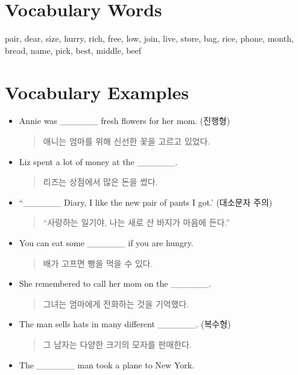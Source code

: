 \documentclass{article}
\begin{document}
\renewcommand{\familydefault}{\sfdefault}
\onehalfspacing
\fontsize{12pt}{14pt}\selectfont

\section*{Vocabulary Words}
\begin{addmargin}[1em]{1em}
pair, dear, size, hurry, rich, free, low, join, live, store, bag, rice, phone, month, bread, name, pick, best, middle, beef
\end{addmargin}

\section*{Vocabulary Examples}
\begin{addmargin}[1em]{1em}
\begin{itemize}
    \item Annie was \_\_\_\_\_\_ fresh flowers for her mom. (진행형)
    \begin{quote}
    애니는 엄마를 위해 신선한 꽃을 고르고 있었다.
    \end{quote}
    \item Liz spent a lot of money at the \_\_\_\_\_\_.
    \begin{quote}
    리즈는 상점에서 많은 돈을 썼다.
    \end{quote}
    \item ``\_\_\_\_\_\_ Diary, I like the new pair of pants I got.' (대소문자 주의)
    \begin{quote}
    ``사랑하는 일기야, 나는 새로 산 바지가 마음에 든다.''
    \end{quote}
    \item You can eat some \_\_\_\_\_\_ if you are hungry.
    \begin{quote}
    배가 고프면 빵을 먹을 수 있다.
    \end{quote}
    \item She remembered to call her mom on the \_\_\_\_\_\_.
    \begin{quote}
    그녀는 엄마에게 전화하는 것을 기억했다.
    \end{quote}
    \item The man sells hats in many different \_\_\_\_\_\_. (복수형)
    \begin{quote}
    그 남자는 다양한 크기의 모자를 판매한다.
    \end{quote}
    \item The \_\_\_\_\_\_ man took a plane to New York.

\end{itemize}
\end{addmargin}
\end{document}
